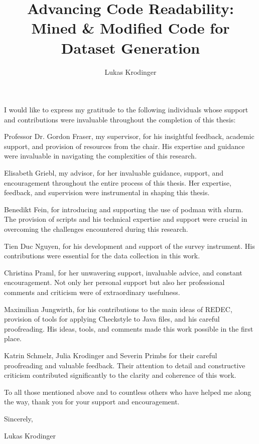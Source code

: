 \documentclass[%
class=scrreprt,
chapterprefix=false,%
open=right,%
twoside=true,%
paper=a4,%
logofile={Logo\_zentral\_farbig\_EN.png},%
thesistype=master,%
UKenglish,%
]{se2thesis}
\author{Lukas Krodinger}
\title{Advancing Code Readability: Mined \& Modified Code for Dataset Generation}
\institute{Chair of Software Engineering II}
\theoremstyle{definition}
\begin{document}
	
	\frontmatter
	
	\maketitle
	
	\begin{acknowledgements}
		I would like to express my gratitude to the following individuals whose support and contributions were invaluable throughout the completion of this thesis:
		
		Professor Dr. Gordon Fraser, my supervisor, for his insightful feedback, academic support, and provision of resources from the chair. His expertise and guidance were invaluable in navigating the complexities of this research.
		
		Elisabeth Griebl, my advisor, for her invaluable guidance, support, and encouragement throughout the entire process of this thesis. Her expertise, feedback, and supervision were instrumental in shaping this thesis.
		
		Benedikt Fein, for introducing and supporting the use of podman with slurm. The provision of scripts and his technical expertise and support were crucial in overcoming the challenges encountered during this research.
		
		Tien Duc Nguyen, for his development and support of the survey instrument. His contributions were essential for the data collection in this work.
		
		Christina Praml, for her unwavering support, invaluable advice, and constant encouragement. Not only her personal support but also her professional comments and criticism were of extraordinary usefulness.
		
		Maximilian Jungwirth, for his contributions to the main ideas of REDEC, provision of tools for applying Checkstyle to Java files, and his careful proofreading. His ideas, tools, and comments made this work possible in the first place.
			
		Katrin Schmelz, Julia Krodinger and Severin Primbs for their careful proofreading and valuable feedback. Their attention to detail and constructive criticism contributed significantly to the clarity and coherence of this work.
		
		To all those mentioned above and to countless others who have helped me along the way, thank you for your support and encouragement.
		
		Sincerely,

		Lukas Krodinger
	\end{acknowledgements}
	
\end{document}
